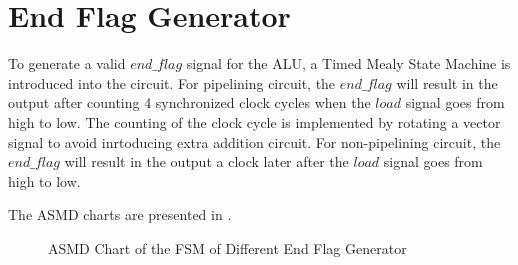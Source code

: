 \section{End Flag Generator}

To generate a valid \(end\_flag\) signal for the ALU, a Timed Mealy State Machine is introduced into the circuit.
For pipelining circuit, the \(end\_flag\) will result in the output after counting 4 synchronized clock cycles
when the \(load\) signal goes from high to low. The counting of the clock cycle is implemented by rotating a
vector signal to avoid inrtoducing extra addition circuit.
For non-pipelining circuit, the \(end\_flag\) will result in the output a clock later after the \(load\) signal goes from high to low.

The ASMD charts are presented in .

\begin{figure}[!ht]
	\centering
	\caption{ASMD Chart of the FSM of Different End Flag Generator}
	\label{fig:asmd}

	\hspace{1cm}

\end{figure}

